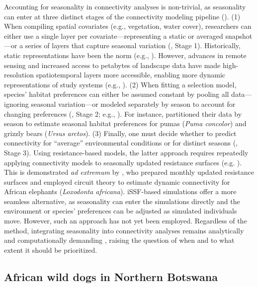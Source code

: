 \documentclass[abstract=on,10pt,a4paper,bibliography=totocnumbered]{article}
\begin{document}
Accounting for seasonality in connectivity analyses is non-trivial, as
seasonality can enter at three distinct stages of the connectivity modeling
pipeline (). (1) When compiling spatial covariates
(e.g., vegetation, water cover), researchers can either use a single layer per
covariate—representing a static or averaged snapshot—or a series of layers that
capture seasonal variation (, Stage 1). Historically,
static representations have been the norm (e.g., \citealp{Elliot.2014,
Brennan.2020}). However, advances in remote sensing and increased access to
petabytes of landscape data \citep{Toth.2016, Rumiano.2020} have made
high-resolution spatiotemporal layers more accessible, enabling more dynamic
representations of study systems (e.g., \citealp{Osipova.2019, Kaszta.2021,
Forrest.2024}). (2) When fitting a selection model, species' habitat preferences
can either be assumed constant by pooling all data—ignoring seasonal
variation—or modeled separately by season to account for changing preferences
(, Stage 2; e.g., \citealp{Fortin.2005, Manly.2007,
Cushman.2010, Zeller.2020}). For instance, \citet{Chetkiewicz.2009} partitioned
their data by season to estimate seasonal habitat preferences for pumas
(\textit{Puma concolor}) and grizzly bears (\textit{Ursus arctos}). (3) Finally,
one must decide whether to predict connectivity for ``average'' environmental
conditions or for distinct seasons (, Stage 3). Using
resistance-based models, the latter approach requires repeatedly applying
connectivity models to seasonally updated resistance surfaces (e.g.
\citealp{Osipova.2019, Zeller.2020, Kaszta.2021, Ciudad.2021}). This is
demonstrated \textit{ad extremum} by \citet{Kaszta.2021}, who prepared monthly
updated resistance surfaces and employed circuit theory to estimate dynamic
connectivity for African elephants (\textit{Loxodonta africana}). iSSF-based
simulations offer a more seamless alternative, as seasonality can enter the
simulations directly and the environment or species' preferences can be adjusted
as simulated individuals move. However, such an approach has not yet been
employed. Regardless of the method, integrating seasonality into connectivity
analyses remains analytically and computationally demanding
\citep{Bishop-Taylor.2018}, raising the question of when and to what extent it
should be prioritized.

\subsection{African wild dogs in Northern Botswana}
\end{document}
